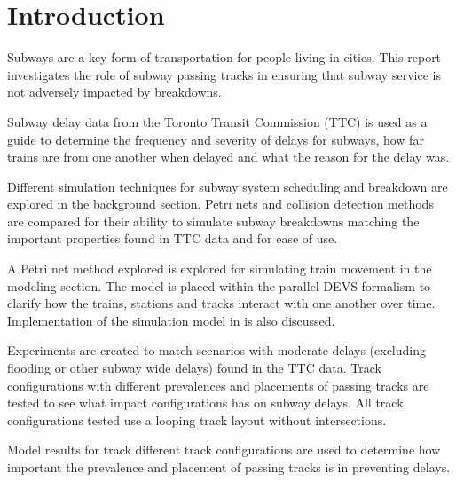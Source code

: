\section{Introduction}

Subways are a key form of transportation for people living in cities. This
report investigates the role of subway passing tracks in ensuring that subway
service is not adversely impacted by breakdowns.

Subway delay data from the Toronto Transit Commission (TTC) is used as a guide
to determine the frequency and severity of delays for subways, how far trains 
are from one another when delayed and what the reason for the delay was.

Different simulation techniques for subway system scheduling and breakdown are
explored in the background section. Petri nets and collision detection methods
are compared for their ability to simulate subway breakdowns matching the
important properties found in TTC data and for ease of use. 

A Petri net method explored is explored for simulating train movement in the
modeling section. The model is placed within the parallel DEVS formalism to
clarify how the trains, stations and tracks interact with one another over time.
Implementation of the simulation model in  is also discussed.

Experiments are created to match scenarios with moderate delays (excluding
flooding or other subway wide delays) found in the TTC data. Track
configurations with different prevalences and placements of passing tracks are
tested to see what impact configurations has on subway delays. All track
configurations tested use a looping track layout without intersections.

Model results for track different track configurations are used to determine how
important the prevalence and placement of passing tracks is in preventing
delays. 